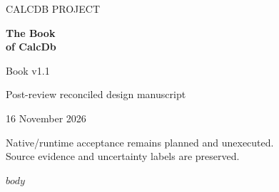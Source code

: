 \documentclass[10pt,a4paper,oneside]{book}
\begin{document}
\hypersetup{pageanchor=false}
\begin{titlepage}
\vspace*{35mm}
{\sffamily\small CALCDB PROJECT\par}
\vspace{12mm}
{\sffamily\bfseries\fontsize{38}{43}\selectfont The Book\\of CalcDb\par}
\vspace{12mm}
{\Large Book v1.1\par}
\vspace{4mm}
{\large Post-review reconciled design manuscript\par}
\vfill
{16 November 2026\par}
\vspace{5mm}
{\small Native/runtime acceptance remains planned and unexecuted.\\Source evidence and uncertainty labels are preserved.\par}
\end{titlepage}
\hypersetup{pageanchor=true}
\tableofcontents
\clearpage
{}
$body$
\end{document}
